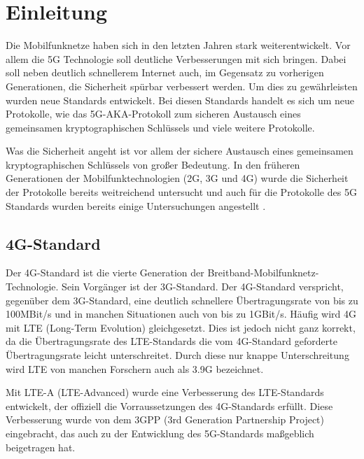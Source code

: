 \chapter{Einleitung}
\label{chap:1}

Die Mobilfunknetze haben sich in den letzten Jahren stark weiterentwickelt. 
Vor allem die 5G Technologie soll deutliche Verbesserungen mit sich bringen. 
Dabei soll neben deutlich schnellerem Internet auch, im Gegensatz zu vorherigen Generationen, die Sicherheit spürbar verbessert werden.
Um dies zu gewährleisten wurden neue Standards entwickelt. 
Bei diesen Standards handelt es sich um neue Protokolle, wie das 5G-AKA-Protokoll zum sicheren Austausch eines gemeinsamen kryptographischen Schlüssels und viele weitere Protokolle.

Was die Sicherheit angeht ist vor allem der sichere Austausch eines gemeinsamen kryptographischen Schlüssels von großer Bedeutung. 
In den früheren Generationen der Mobilfunktechnologien (2G, 3G und 4G) wurde die Sicherheit der Protokolle bereits weitreichend untersucht und auch für die Protokolle des 5G Standards wurden bereits einige Untersuchungen angestellt \cite{Compare}.


\section{4G-Standard}
Der 4G-Standard ist die vierte Generation der Breitband-Mobilfunknetz-Technologie. %
Sein Vorgänger ist der 3G-Standard. 
Der 4G-Standard verspricht, gegenüber dem 3G-Standard, eine deutlich schnellere Übertragungsrate von bis zu 100MBit/s und in manchen Situationen auch von bis zu 1GBit/s. %
Häufig wird 4G mit LTE (Long-Term Evolution) gleichgesetzt. %
Dies ist jedoch nicht ganz korrekt, da die Übertragungsrate des LTE-Standards die vom 4G-Standard geforderte Übertragungsrate leicht unterschreitet. 
Durch diese nur knappe Unterschreitung wird LTE von manchen Forschern auch als 3.9G bezeichnet. %

Mit LTE-A (LTE-Advanced) wurde eine Verbesserung des LTE-Standards entwickelt, der offiziell die Vorraussetzungen des 4G-Standards erfüllt. %
Diese Verbesserung wurde von dem 3GPP (3rd Generation Partnership Project) eingebracht, das auch zu der Entwicklung des 5G-Standards maßgeblich beigetragen hat. %


